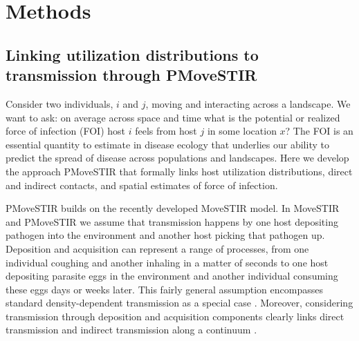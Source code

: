 \documentclass[letterpaper]{article}
\begin{document}





\section*{Methods}

\subsection*{Linking utilization distributions to transmission through PMoveSTIR}

Consider two individuals, $i$ and $j$, moving and interacting across a landscape.  We want to ask: on average across space and time what is the potential or realized force of infection (FOI) host $i$ feels from host $j$ in some location $x$?  The FOI is an essential quantity to estimate in disease ecology that underlies our ability to predict the spread of disease across populations and landscapes. Here we develop the approach PMoveSTIR that formally links host utilization distributions, direct and indirect contacts, and spatial estimates of force of infection.

PMoveSTIR builds on the recently developed MoveSTIR model. In MoveSTIR and PMoveSTIR we assume that transmission happens by one host depositing pathogen into the environment and another host picking that pathogen up.  Deposition and acquisition can represent a range of processes, from one individual coughing and another inhaling in a matter of seconds to one host depositing parasite eggs in the environment and another individual consuming these eggs days or weeks later. This fairly general assumption encompasses standard density-dependent transmission as a special case \citep{Cortez2021}. Moreover, considering transmission through deposition and acquisition components clearly links direct transmission and indirect transmission along a continuum \citep{Wilber2022}.
\end{document}

